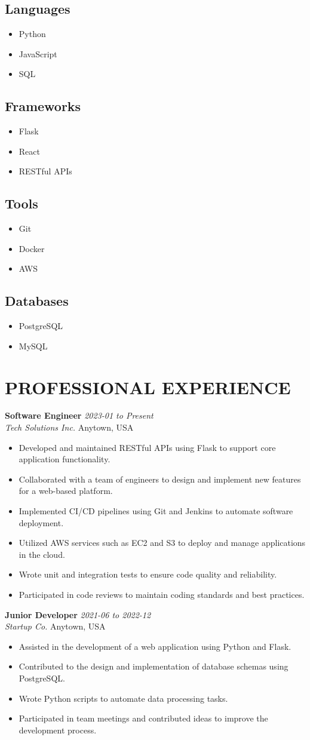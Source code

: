 \documentclass[11pt,letterpaper]{article}
\newcommand{\jobTitle}[2]{
  \textbf{\textcolor{primary}{#1}} \hfill \textit{#2}\\
}
\newcommand{\companyInfo}[2]{
  \textit{#1} \hfill #2\\
}
\newcommand{\bulletItem}[1]{
  \item #1
}
\newcommand{\customBullets}[1]{
  \begin{itemize}[leftmargin=*,label=\textcolor{secondary}{\scriptsize\textbullet},itemsep=2pt,parsep=0pt]
    #1
  \end{itemize}
}
\begin{document}
\begin{multicols}{2}

    \subsection{Languages}
    \customBullets{
      \bulletItem{Python}
      \bulletItem{JavaScript}
      \bulletItem{SQL}
    }
    \subsection{Frameworks}
    \customBullets{
      \bulletItem{Flask}
      \bulletItem{React}
      \bulletItem{RESTful APIs}
    }
    \columnbreak
    \subsection{Tools}
    \customBullets{
      \bulletItem{Git}
      \bulletItem{Docker}
      \bulletItem{AWS}
    }
    \subsection{Databases}
    \customBullets{
      \bulletItem{PostgreSQL}
      \bulletItem{MySQL}
    }
\end{multicols}

\section{PROFESSIONAL EXPERIENCE}

\jobTitle{Software Engineer}{2023-01 to Present}
\companyInfo{Tech Solutions Inc.}{Anytown, USA}
\customBullets{
  \bulletItem{Developed and maintained RESTful APIs using Flask to support core application functionality.}
  \bulletItem{Collaborated with a team of engineers to design and implement new features for a web-based platform.}
  \bulletItem{Implemented CI/CD pipelines using Git and Jenkins to automate software deployment.}
  \bulletItem{Utilized AWS services such as EC2 and S3 to deploy and manage applications in the cloud.}
  \bulletItem{Wrote unit and integration tests to ensure code quality and reliability.}
  \bulletItem{Participated in code reviews to maintain coding standards and best practices.}
}

\vspace{8pt}
\jobTitle{Junior Developer}{2021-06 to 2022-12}
\companyInfo{Startup Co.}{Anytown, USA}
\customBullets{
  \bulletItem{Assisted in the development of a web application using Python and Flask.}
  \bulletItem{Contributed to the design and implementation of database schemas using PostgreSQL.}
  \bulletItem{Wrote Python scripts to automate data processing tasks.}
  \bulletItem{Participated in team meetings and contributed ideas to improve the development process.}
}
\end{document}

